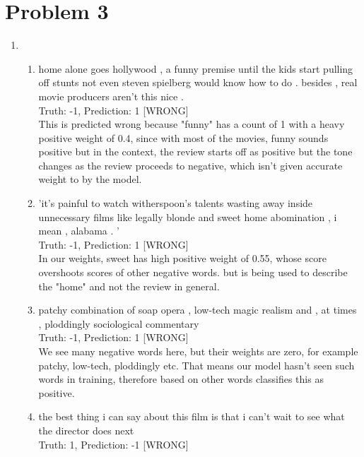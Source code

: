 \documentclass[12pt]{article}
\begin{document}
\section*{Problem 3}
\begin{enumerate}[label=(\alph*)]
	\addtocounter{enumi}{3}
	\item \mbox{}
	\begin{enumerate}[label=(\arabic*)]
		\item  
		home alone goes hollywood , a funny premise until the kids start 			pulling off stunts not even steven spielberg would know how to 			do . besides , real movie producers aren't this nice . \\
		Truth: -1, Prediction: 1 [WRONG] \\

		This is predicted wrong because "funny" has a count of 1 with a 			heavy positive weight of 0.4, since with most of the movies, 					funny sounds positive but in the context, the review starts off as 			positive but the tone changes as the review proceeds to negative, 		which isn't given accurate weight to by the model.\\
		\item 'it's painful to watch witherspoon's talents wasting away 				inside unnecessary films like legally blonde and sweet home 					abomination , i mean , alabama . ' \\
		Truth: -1, Prediction: 1 [WRONG] \\
		
		In our weights, sweet has high positive weight of 0.55, whose score overshoots scores of other negative words. but is being used to describe the "home" and not the review in general.
		\item patchy combination of soap opera , low-tech magic realism and , at times , ploddingly sociological commentary \\
		Truth: -1, Prediction: 1 [WRONG] \\
		
		We see many negative words here, but their weights are zero, for example patchy, low-tech, ploddingly etc. That means our model hasn't seen such words in training, therefore based on other words classifies this as positive. \\
		\item the best thing i can say about this film is that i can't wait to see what the director does next \\
		Truth: 1, Prediction: -1 [WRONG] \\
		

\end{enumerate}
\end{enumerate}
\end{document}
